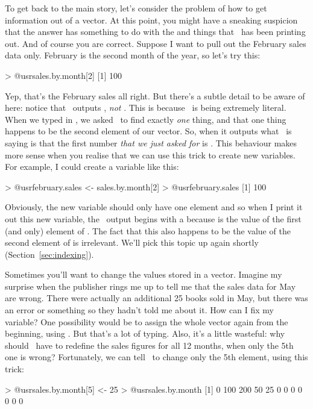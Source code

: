 To get back to the main story, let's consider the problem of how to get information out of a vector. At this point, you might have a sneaking suspicion that the answer has something to do with the \rtextoutput{[1]} and \rtextoutput{[9]} things that \R\ has been printing out. And of course you are correct. Suppose I want to pull out the February sales data only. February is the second month of the year, so let's try this:
\begin{rblock1}
> @usr{sales.by.month[2]}
[1] 100
\end{rblock1}
Yep, that's the February sales all right. But there's a subtle detail to be aware of here: notice that \R\ outputs , {\it not} . This is because \R\ is being extremely literal. When we typed in , we asked \R\ to find exactly {\it one} thing, and that one thing happens to be the second element of our  vector. So, when it outputs  what \R\ is saying is that the first number {\it that we just asked for} is . This behaviour makes more sense when you realise that we can use this trick to create new variables. For example, I could create a  variable like this:
\begin{rblock1}
> @usr{february.sales <- sales.by.month[2]}
> @usr{february.sales}
[1] 100
\end{rblock1}
Obviously, the new variable  should only have one element and so when I print it out this new variable, the \R\ output begins with a \rtextoutput{[1]} because  is the value of the first (and only) element of . The fact that this also happens to be the value of the second element of  is irrelevant. We'll pick this topic up again shortly (Section~\ref{sec:indexing}). 


Sometimes you'll want to change the values stored in a vector. Imagine my surprise when the publisher rings me up to tell me that the sales data for May are wrong. There were actually an additional 25 books sold in May, but there was an error or something so they hadn't told me about it. How can I fix my  variable? One possibility would be to assign the whole vector again from the beginning, using . But that's a lot of typing. Also, it's a little wasteful: why should \R\ have to redefine the sales figures for all 12 months, when only the 5th one is wrong? Fortunately, we can tell \R\ to change only the 5th element, using this trick:
\begin{rblock1}
> @usr{sales.by.month[5] <- 25}
> @usr{sales.by.month}
 [1]   0 100 200  50  25   0   0   0   0   0   0   0
\end{rblock1}

